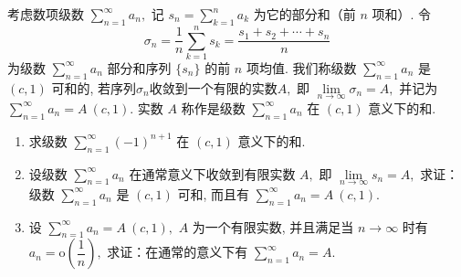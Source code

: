 \begin{question}[points = 12]
考虑数项级数 $\sum\limits_{n=1}^{\infty} a_n,$ 记 $s_n = \sum\limits_{k=1}^n a_k$ 为它的部分和（前 $n$ 项和）. 令
$$\sigma_n = \dfrac{1}{n} \sum\limits_{k=1}^n s_k = \dfrac{s_1 + s_2 + \cdots + s_n}{n}$$
为级数 $\sum\limits_{n=1}^{\infty} a_n$ 部分和序列 $\{s_n\}$ 的前 $n$ 项均值. 我们称级数 $\sum\limits_{n=1}^{\infty} a_n$ 是 $(c, 1)$ 可和的, 若序列$\sigma_n$收敛到一个有限的实数$A,$ 即 $\lim\limits_{n \to \infty} \sigma_n = A,$ 并记为 $\sum\limits_{n=1}^{\infty} a_n = A~(c, 1).$ 实数 $A$ 称作是级数 $\sum\limits_{n=1}^{\infty} a_n$ 在 $(c, 1)$ 意义下的和.
\begin{enumerate}
\item 求级数 $\sum\limits_{n=1}^{\infty} (-1)^{n+1}$ 在 $(c, 1)$ 意义下的和.
\item 设级数 $\sum\limits_{n=1}^{\infty} a_n$ 在通常意义下收敛到有限实数 $A,$ 即 $\lim\limits_{n \to \infty} s_n = A,$ 求证：级数 $\sum\limits_{n=1}^{\infty} a_n$ 是 $(c, 1)$ 可和, 而且有 $\sum\limits_{n=1}^{\infty} a_n = A~(c, 1).$
\item 设 $\sum\limits_{n=1}^{\infty} a_n = A~(c, 1),$ $A$ 为一个有限实数, 并且满足当 $n \to \infty$ 时有 $a_n = \mathrm{o}\left( \dfrac{1}{n} \right),$ 求证：在通常的意义下有 $\sum\limits_{n=1}^{\infty} a_n = A.$
\end{enumerate}

\end{question}

